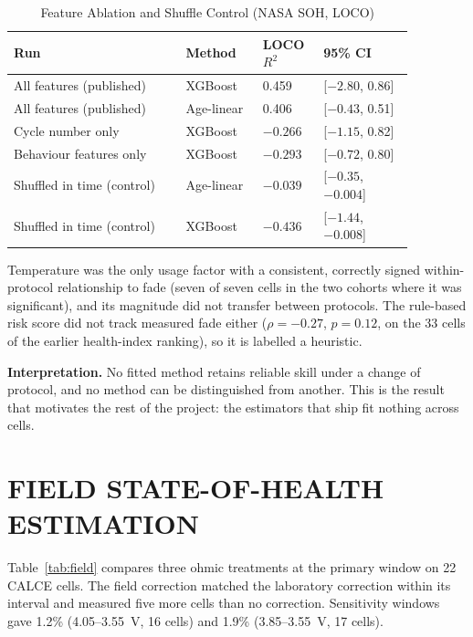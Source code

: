 \documentclass[12pt,a4paper]{amritareport}
\begin{document}
\begin{table}[htbp]
	\caption{Feature Ablation and Shuffle Control (NASA SOH, LOCO)}
	\centering
	\small
	\renewcommand{\arraystretch}{1.15}
	\setlength{\tabcolsep}{4pt}
	\begin{tabular}{|L{0.38\linewidth}|L{0.17\linewidth}|C{0.12\linewidth}|C{0.2\linewidth}|}
		\hline
		\textbf{Run} & \textbf{Method} & \textbf{LOCO $R^2$} & \textbf{95\% CI} \\
		\hline
		All features (published) & XGBoost & 0.459 & [$-2.80$, 0.86] \\
		\hline
		All features (published) & Age-linear & 0.406 & [$-0.43$, 0.51] \\
		\hline
		Cycle number only & XGBoost & $-0.266$ & [$-1.15$, 0.82] \\
		\hline
		Behaviour features only & XGBoost & $-0.293$ & [$-0.72$, 0.80] \\
		\hline
		Shuffled in time (control) & Age-linear & $-0.039$ & [$-0.35$, $-0.004$] \\
		\hline
		Shuffled in time (control) & XGBoost & $-0.436$ & [$-1.44$, $-0.008$] \\
		\hline
	\end{tabular}
	\label{tab:ablation}
\end{table}

Temperature was the only usage factor with a consistent, correctly signed within-protocol relationship to fade (seven of seven cells in the two cohorts where it was significant), and its magnitude did not transfer between protocols. The rule-based risk score did not track measured fade either ($\rho = -0.27$, $p = 0.12$, on the 33 cells of the earlier health-index ranking), so it is labelled a heuristic.

\textbf{Interpretation.} No fitted method retains reliable skill under a change of protocol, and no method can be distinguished from another. This is the result that motivates the rest of the project: the estimators that ship fit nothing across cells.

\section{FIELD STATE-OF-HEALTH ESTIMATION}
\label{sec:res-field}

Table~\ref{tab:field} compares three ohmic treatments at the primary window on 22 CALCE cells. The field correction matched the laboratory correction within its interval and measured five more cells than no correction. Sensitivity windows gave 1.2\% (4.05--3.55~V, 16 cells) and 1.9\% (3.85--3.55~V, 17 cells).
\end{document}
